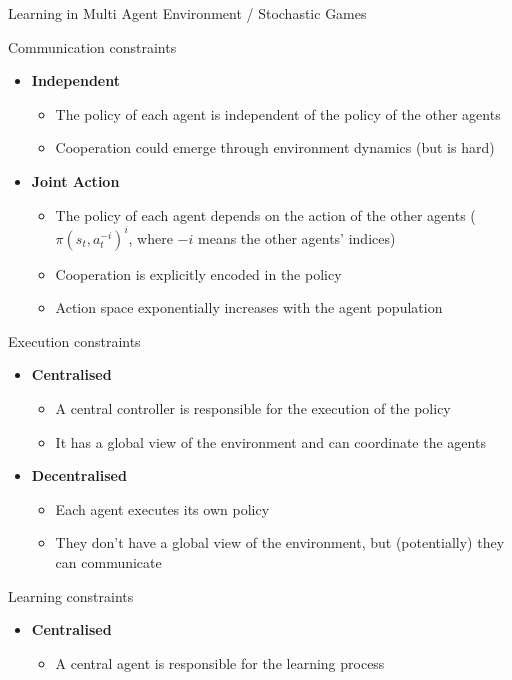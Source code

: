 \documentclass[presentation, 9pt]{beamer}\mode<presentation>{\usetheme{AMSBolognaFC}}
\begin{document}
\begin{frame}[allowframebreaks]{Learning in Multi Agent Environment / Stochastic Games}
\begin{exampleblock}{Communication constraints}
\begin{itemize}
	\item \textbf{Independent}
	\begin{itemize}
		\item The policy of each agent is independent of the policy of the other agents
		\item Cooperation could emerge through environment dynamics (but is hard)
	\end{itemize}
	\item \textbf{Joint Action}
	\begin{itemize}
		\item The policy of each agent depends on the action of the other agents ($ \pi(s_t, a^{-i}_t)^i $, where $-i$ means the other agents' indices)
		\item Cooperation is explicitly encoded in the policy
		\item Action space exponentially increases with the agent population
	\end{itemize}
\end{itemize}
\end{exampleblock}
\begin{exampleblock}{Execution constraints}
\begin{itemize}
	\item \textbf{Centralised}
	\begin{itemize}
		\item A central controller is responsible for the execution of the policy
		\item It has a global view of the environment and can coordinate the agents
	\end{itemize}
	\item \textbf{Decentralised}
	\begin{itemize}
		\item Each agent executes its own policy
		\item They don't have a global view of the environment, but (potentially) they can communicate
	\end{itemize}
\end{itemize}
\end{exampleblock}
\begin{exampleblock}{Learning constraints}
\begin{itemize}
	\item \textbf{Centralised}
	\begin{itemize}
		\item A central agent is responsible for the learning process

\end{itemize}
\end{itemize}
\end{exampleblock}
\end{frame}
\end{document}
